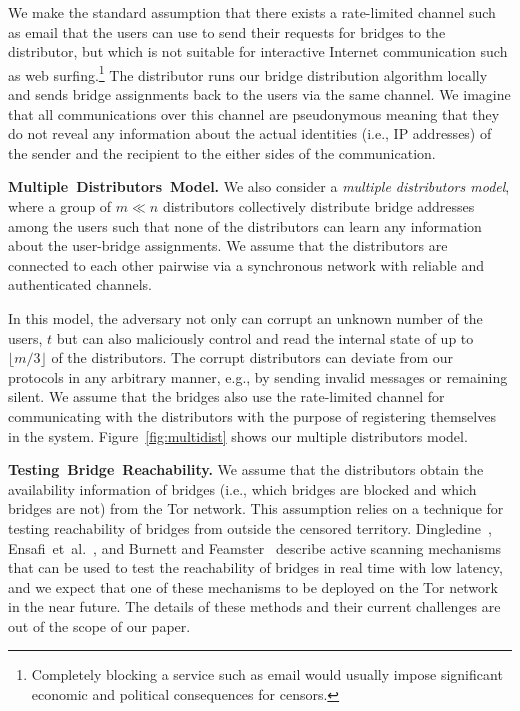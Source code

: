 \documentclass[a4paper,UKenglish]{lipics-v2016}
\newcommand{\fullpaper}[1]{#1}
\newcommand{\fullpaper}[1]{}
\newcommand{\etal}{et~al.}
\newcommand{\eg}{e.g.}
\newcommand{\sfsize}{\fontsize{0.68\baselineskip}{0.68\baselineskip}\selectfont}
\newcommand{\sans}[1]{\textbf{\textsf{\sfsize \mbox{#1}}}}
\newcommand{\para}[1]{\vspace{0.55em} \noindent \sans{{\mbox{#1}}}}
\begin{document}
We make the standard assumption that there exists a rate-limited channel such as email that the users can use to send their requests for bridges to the distributor, but which is not suitable for interactive Internet communication such as web surfing.\footnote{Completely blocking a service such as email would usually impose significant economic and political consequences for censors.} The distributor runs our bridge distribution algorithm locally and sends bridge assignments back to the users via the same channel. \fullpaper{We imagine that all communications over this channel are pseudonymous meaning that they do not reveal any information about the actual identities (i.e., IP addresses) of the sender and the recipient to the either sides of the communication.}

\para{Multiple Distributors Model.} 
We also consider a \emph{multiple distributors model}, where a group of \mbox{$m \ll n$} distributors collectively distribute bridge addresses among the users such that none of the distributors can learn any information about the user-bridge assignments. We assume that the distributors are connected to each other pairwise via a synchronous network with reliable and authenticated channels.

In this model, the adversary not only can corrupt an unknown number of the users, $t$ but can also maliciously control and read the internal state of up to $\lfloor m/3 \rfloor$ of the distributors. The corrupt distributors can deviate from our protocols in any arbitrary manner, \eg, by sending invalid messages or remaining silent. 
We assume that the bridges also use the rate-limited channel for communicating with the distributors with the purpose of registering themselves in the system. Figure~\ref{fig:multidist} shows our multiple distributors model.

\para{Testing Bridge Reachability.} We assume that the distributors obtain the availability information of bridges (i.e., which bridges are blocked and which bridges are not) from the Tor network. This assumption relies on a technique for testing reachability of bridges from outside the censored territory. Dingledine~\cite{Dingledine:BridgeReach:2011}, Ensafi~\etal~\cite{Ensafi:2014:PAM}, and Burnett and Feamster~\cite{Burnett:2015:ELM} describe active scanning mechanisms that can be used to test the reachability of bridges in real time with low latency, and we expect that one of these mechanisms to be deployed on the Tor network in the near future. The details of these methods and their current challenges are out of the scope of our paper.
\end{document}
